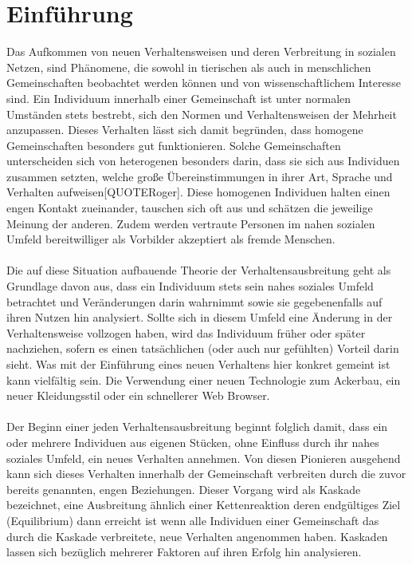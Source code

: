 \documentclass[12pt]{article}
\begin{document}
\section{Einführung}
Das Aufkommen von neuen Verhaltensweisen und deren Verbreitung in sozialen Netzen, sind Phänomene, die sowohl in tierischen als auch in menschlichen Gemeinschaften beobachtet werden können und von wissenschaftlichem Interesse sind. Ein Individuum innerhalb einer Gemeinschaft ist unter normalen Umständen stets bestrebt, sich den Normen und Verhaltensweisen der Mehrheit anzupassen. Dieses Verhalten lässt sich damit begründen, dass homogene Gemeinschaften besonders gut funktionieren. Solche Gemeinschaften unterscheiden sich von heterogenen besonders darin, dass sie sich aus Individuen zusammen setzten, welche große Übereinstimmungen in ihrer Art, Sprache und Verhalten aufweisen[QUOTERoger]. Diese homogenen Individuen halten einen engen Kontakt zueinander, tauschen sich oft aus und schätzen die jeweilige Meinung der anderen. Zudem werden vertraute Personen im nahen sozialen Umfeld bereitwilliger als Vorbilder akzeptiert als fremde Menschen.\\\\
Die auf diese Situation aufbauende Theorie der Verhaltensausbreitung geht als Grundlage davon aus, dass ein Individuum stets sein nahes soziales Umfeld betrachtet und Veränderungen darin wahrnimmt sowie sie gegebenenfalls auf ihren Nutzen hin analysiert. Sollte sich in diesem Umfeld eine Änderung in der Verhaltensweise vollzogen haben, wird das Individuum früher oder später nachziehen, sofern es einen tatsächlichen (oder auch nur gefühlten) Vorteil darin sieht. Was mit der Einführung eines neuen Verhaltens hier konkret gemeint ist kann vielfältig sein. Die Verwendung einer neuen Technologie zum Ackerbau, ein neuer Kleidungsstil oder ein schnellerer Web Browser.\\\\
Der Beginn einer jeden Verhaltensausbreitung beginnt folglich damit, dass ein oder mehrere Individuen aus eigenen Stücken, ohne Einfluss durch ihr nahes soziales Umfeld, ein neues Verhalten annehmen. Von diesen Pionieren ausgehend kann sich dieses Verhalten innerhalb der Gemeinschaft verbreiten durch die zuvor bereits genannten, engen Beziehungen. Dieser Vorgang wird als Kaskade bezeichnet, eine Ausbreitung ähnlich einer Kettenreaktion deren endgültiges Ziel (Equilibrium) dann erreicht ist wenn alle Individuen einer Gemeinschaft das durch die Kaskade verbreitete, neue Verhalten angenommen haben.
Kaskaden lassen sich bezüglich mehrerer Faktoren auf ihren Erfolg hin analysieren.
\end{document}
